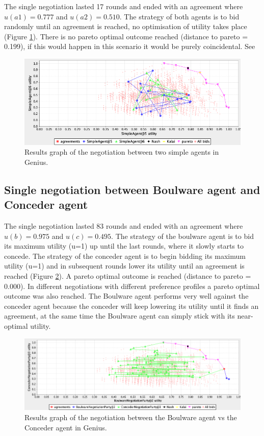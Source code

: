 \documentclass[a4paper]{article}
\begin{document}
The single negotiation lasted 17 rounds and ended with an agreement where $u(a1) = 0.777$ and $u(a2) = 0.510$. The strategy of both agents is to bid randomly until an agreement is reached, no optimisation of utility takes place (Figure \ref{fig:simplevssimple}). There is no pareto optimal outcome reached (distance to pareto = 0.199), if this would happen in this scenario it would be purely coincidental. See

\begin{figure}[h!]
\centering
\includegraphics[width=125mm]{simplevssimple.png}
\caption{\label{fig:simplevssimple} Results graph of the negotiation between two simple agents in Genius.}  
\end{figure}

\subsection{Single negotiation between Boulware agent and Conceder agent}

The single negotiation lasted 83 rounds and ended with an agreement where $u(b) = 0.975$ and $u(c) = 0.495$. The strategy of the boulware agent is to bid its maximum utility (u=1) up until the last rounds, where it slowly starts to concede. The strategy of the conceder agent is to begin bidding its maximum utility (u=1) and in subsequent rounds lower its utility until an agreement is reached (Figure \ref{fig:boulvsconcede}). A pareto optimal outcome is reached (distance to pareto = 0.000). In different negotiations with different preference profiles a pareto optimal outcome was also reached. The Boulware agent performs very well against the conceder agent because the conceder will keep lowering its utility until it finds an agreement, at the same time the Boulware agent can simply stick with its near-optimal utility. 

\begin{figure}[h!]
\centering
\includegraphics[width=125mm]{boulvsconcede.png}
\caption{\label{fig:boulvsconcede} Results graph of the negotiation between the Boulware agent vs the Conceder agent in Genius.}  
\end{figure}
\end{document}
